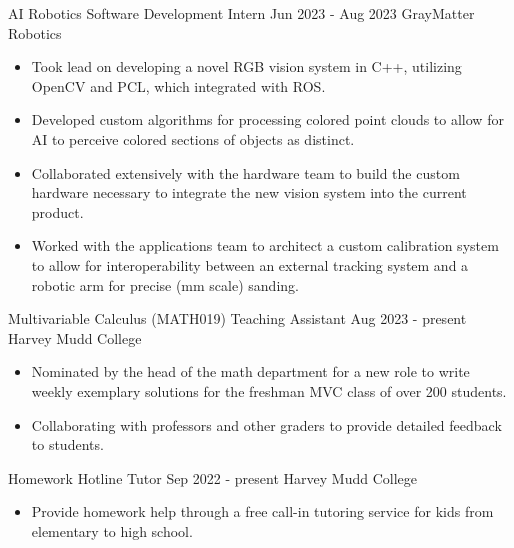 \documentclass[9pt]{resume}
\begin{document}
    
    \vspace{0.5cm}

    \begin{experiencelist}
        \experience 
            {AI Robotics Software Development Intern}
            {Jun 2023 - Aug 2023}
            {GrayMatter Robotics}
            {\begin{itemize}[noitemsep, topsep=1pt]
                \item Took lead on developing a novel RGB vision system in C++, utilizing OpenCV and PCL, which integrated with ROS.
                \item Developed custom algorithms for processing colored point clouds to allow for AI to perceive colored sections of objects as distinct.
                \item Collaborated extensively with the hardware team to build the custom hardware necessary to integrate the new vision system into the current product.
                \item Worked with the applications team to architect a custom calibration system to allow for interoperability between an external tracking system and a robotic arm for precise (mm scale) sanding.
            \end{itemize}}
        \experience 
            {Multivariable Calculus (MATH019) Teaching Assistant}
            {Aug 2023 - present}
            {Harvey Mudd College}
            {\begin{itemize}[noitemsep, topsep=1pt] 
                \item Nominated by the head of the math department for a new role to write weekly exemplary solutions for the freshman MVC class of over 200 students.
                \item Collaborating with professors and other graders to provide detailed feedback to students. 
            \end{itemize}}
        \experience
            {Homework Hotline Tutor}
            {Sep 2022 - present} 
            {Harvey Mudd College}
            {\begin{itemize}[noitemsep, topsep=1pt]
                \item Provide homework help through a free call-in tutoring service for kids from elementary to high school.
            \end{itemize}}
    \end{experiencelist}
\end{document}
